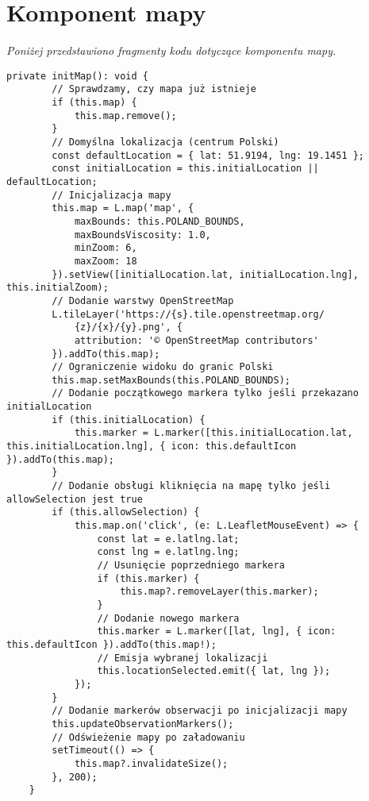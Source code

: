 %

\chapter{Komponent mapy}
\label{chapter:dodatek_C}

\textit{Poniżej przedstawiono fragmenty kodu dotyczące komponentu mapy.}

\begin{lstlisting}[style=tsstyle, caption={Inicjalizacja},label={lst:inicjalizacjamapy}]
	private initMap(): void {
		// Sprawdzamy, czy mapa już istnieje
		if (this.map) {
			this.map.remove();
		}
		// Domyślna lokalizacja (centrum Polski)
		const defaultLocation = { lat: 51.9194, lng: 19.1451 };
		const initialLocation = this.initialLocation || defaultLocation;
		// Inicjalizacja mapy
		this.map = L.map('map', {
			maxBounds: this.POLAND_BOUNDS,
			maxBoundsViscosity: 1.0,
			minZoom: 6,
			maxZoom: 18
		}).setView([initialLocation.lat, initialLocation.lng], this.initialZoom);
		// Dodanie warstwy OpenStreetMap
		L.tileLayer('https://{s}.tile.openstreetmap.org/
			{z}/{x}/{y}.png', {
			attribution: '© OpenStreetMap contributors'
		}).addTo(this.map);
		// Ograniczenie widoku do granic Polski
		this.map.setMaxBounds(this.POLAND_BOUNDS);
		// Dodanie początkowego markera tylko jeśli przekazano initialLocation
		if (this.initialLocation) {
			this.marker = L.marker([this.initialLocation.lat, this.initialLocation.lng], { icon: this.defaultIcon }).addTo(this.map);
		}
		// Dodanie obsługi kliknięcia na mapę tylko jeśli allowSelection jest true
		if (this.allowSelection) {
			this.map.on('click', (e: L.LeafletMouseEvent) => {
				const lat = e.latlng.lat;
				const lng = e.latlng.lng;
				// Usunięcie poprzedniego markera
				if (this.marker) {
					this.map?.removeLayer(this.marker);
				}
				// Dodanie nowego markera
				this.marker = L.marker([lat, lng], { icon: this.defaultIcon }).addTo(this.map!);
				// Emisja wybranej lokalizacji
				this.locationSelected.emit({ lat, lng });
			});
		}
		// Dodanie markerów obserwacji po inicjalizacji mapy
		this.updateObservationMarkers();
		// Odświeżenie mapy po załadowaniu
		setTimeout(() => {
			this.map?.invalidateSize();
		}, 200);
	}
\end{lstlisting}

